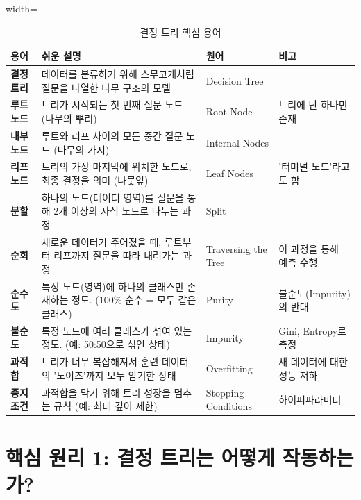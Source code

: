 \documentclass[11pt,a4paper]{book}
\theoremstyle{definition}
\begin{document}
\begin{table}[h!]
    \centering
    \caption{결정 트리 핵심 용어}
    \label{tab:terms}
    \begin{adjustbox}{width=\textwidth}
        \begin{tabular}{lp{6cm}ll}
            \toprule
            용어 & 쉬운 설명 & 원어 & 비고 \\
            \midrule
            \textbf{결정 트리} & 데이터를 분류하기 위해 스무고개처럼 질문을 나열한 나무 구조의 모델 & Decision Tree & \\
            \textbf{루트 노드} & 트리가 시작되는 첫 번째 질문 노드 (나무의 뿌리) & Root Node & 트리에 단 하나만 존재 \\
            \textbf{내부 노드} & 루트와 리프 사이의 모든 중간 질문 노드 (나무의 가지) & Internal Nodes & \\
            \textbf{리프 노드} & 트리의 가장 마지막에 위치한 노드로, 최종 결정을 의미 (나뭇잎) & Leaf Nodes & '터미널 노드'라고도 함 \\
            \textbf{분할} & 하나의 노드(데이터 영역)를 질문을 통해 2개 이상의 자식 노드로 나누는 과정 & Split & \\
            \textbf{순회} & 새로운 데이터가 주어졌을 때, 루트부터 리프까지 질문을 따라 내려가는 과정 & Traversing the Tree & 이 과정을 통해 예측 수행 \\
            \textbf{순수도} & 특정 노드(영역)에 하나의 클래스만 존재하는 정도. (100\% 순수 = 모두 같은 클래스) & Purity & 불순도(Impurity)의 반대 \\
            \textbf{불순도} & 특정 노드에 여러 클래스가 섞여 있는 정도. (예: 50:50으로 섞인 상태) & Impurity & Gini, Entropy로 측정 \\
            \textbf{과적합} & 트리가 너무 복잡해져서 훈련 데이터의 '노이즈'까지 모두 암기한 상태 & Overfitting & 새 데이터에 대한 성능 저하 \\
            \textbf{중지 조건} & 과적합을 막기 위해 트리 성장을 멈추는 규칙 (예: 최대 깊이 제한) & Stopping Conditions & 하이퍼파라미터 \\
            \bottomrule
        \end{tabular}
    \end{adjustbox}
\end{table}


\section{핵심 원리 1: 결정 트리는 어떻게 작동하는가?}
\end{document}
